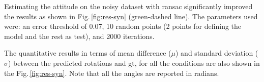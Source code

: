 Estimating the attitude on the noisy dataset with \gls{ransac} significantly
improved the results as shown in Fig.\,\ref{fig:res-syn} (green-dashed
line). The parameters used were: an error threshold of 0.07, 10 random points
(2 points for defining the model and the rest as test), and 2000 iterations.

The quantitative results in terms of mean difference ($\mu$) and standard
deviation ($\sigma$) between the predicted rotations and \gls{gt}, for all the
conditions are also shown in the Fig.\,\ref{fig:res-syn}. Note that all the
angles are reported in radians.




